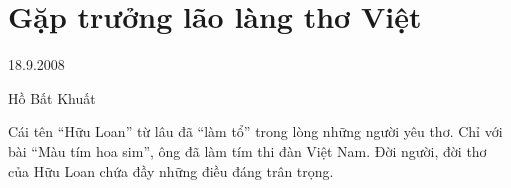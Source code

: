 \documentclass[../main.tex]{subfiles}
\begin{document}
\chapter{Gặp trưởng lão làng thơ Việt}

\begin{metadata}

\begin{flushright}18.9.2008\end{flushright}

Hồ Bất Khuất



\end{metadata}

\begin{multicols}{2}

Cái tên “Hữu Loan” từ lâu đã “làm tổ” trong lòng những người yêu thơ. Chỉ với bài “Màu tím hoa sim”, ông đã làm tím thi đàn Việt Nam. Đời người, đời thơ của Hữu Loan chứa đầy những điều đáng trân trọng. 
  
 

\end{multicols}
\end{document}
